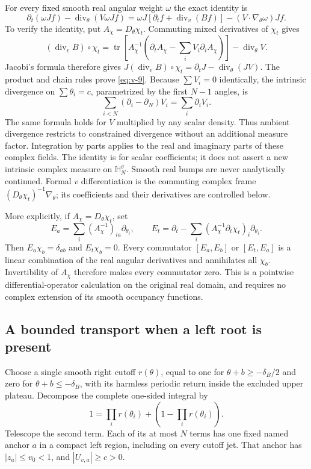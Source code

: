 \documentclass[11pt]{article}
\numberwithin{equation}{section}
\theoremstyle{remark}\newtheorem{remark}[theorem]{Remark}
\begin{document}
For every fixed smooth real angular weight $\omega$ the exact identity
is
\begin{equation}\label{eq:v-9}
\partial_t(\omega Jf)-\operatorname{div}_\theta(V\omega Jf)
 =\omega J[\partial_tf+\operatorname{div}_v(Bf)]
    -(V\cdot\nabla_\theta\omega)Jf.
\end{equation}
To verify the identity, put $A_\chi=D_\theta\chi_t$.
Commuting mixed derivatives of $\chi_t$ gives
\[
 (\operatorname{div}_vB)\circ\chi_t
 =\operatorname{tr}\!\left[A_\chi^{-1}
   \left(\partial_tA_\chi-\sum_iV_i\partial_iA_\chi\right)\right]
     -\operatorname{div}_\theta V.
\]
Jacobi's formula therefore gives
$J(\operatorname{div}_vB)\circ\chi_t
=\partial_tJ-\operatorname{div}_\theta(JV)$.
The product and chain rules prove \eqref{eq:v-9}. Because $\sum V_i=0$ identically, the intrinsic divergence on
$\sum\theta_i=c$, parametrized by the first $N-1$ angles, is
\[
 \sum_{i<N}(\partial_i-\partial_N)V_i=\sum_i\partial_iV_i.
\]
The same formula holds for $V$ multiplied by any scalar density.
Thus ambient divergence restricts to constrained divergence without
an additional measure factor. Integration by parts applies to the
real and imaginary parts of these complex fields.
The identity is for scalar coefficients; it does not assert a new
intrinsic complex measure on $\mathbb H_N^\sigma$. Smooth real bumps are
never analytically continued. Formal $v$ differentiation is the
commuting complex frame $(D_\theta\chi_t)^{-1}\nabla_\theta$; its
coefficients and their derivatives are controlled below.

More explicitly, if $A_\chi=D_\theta\chi_t$, set
\[
 E_a=\sum_i(A_\chi^{-1})_{ia}\partial_{\theta_i},\qquad
 E_t=\partial_t-
       \sum_i(A_\chi^{-1}\partial_t\chi_t)_i\partial_{\theta_i}.
\]
Then $E_a\chi_b=\delta_{ab}$ and $E_t\chi_b=0$. Every commutator
$[E_a,E_b]$ or $[E_t,E_a]$ is a linear combination of the real
angular derivatives and annihilates all $\chi_b$. Invertibility of
$A_\chi$ therefore makes every commutator zero. This is a pointwise
differential-operator calculation on the original real domain, and
requires no complex extension of its smooth occupancy functions.

\subsection{A bounded transport when a left root is present}\label{sec:left-gap}

Choose a single smooth right cutoff $r(\theta)$, equal to one for
$\theta+b\ge-\delta_B/2$ and zero for
$\theta+b\le-\delta_B$, with its harmless periodic return inside the
excluded upper plateau. Decompose the complete one-sided integral by
\[
 1=\prod_i r(\theta_i)+\left(1-\prod_i r(\theta_i)\right).
\]
Telescope the second term. Each of its at most $N$ terms has one fixed
named anchor $a$ in a compact left region, including on every cutoff
jet. That anchor has $|z_a|\le v_0<1$, and $|U_{v,a}|\ge c>0$.
\end{document}

